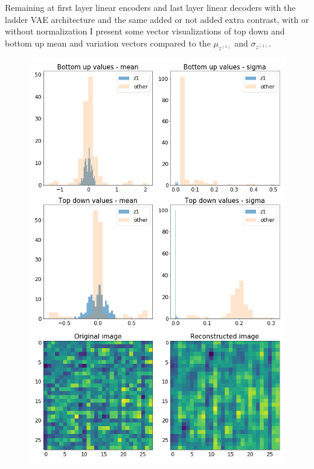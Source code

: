 \documentclass[12pt, english]{article}
\begin{document}
\vspace{4mm}

\par Remaining at first layer linear encoders and last layer linear decoders with the ladder VAE architecture and the same added or not added extra contrast, with or without normalization I present some vector visualizations of top down and bottom up mean and variation vectors compared to the $\mu_{z^{(1)}}$ and $\sigma_{z^{(1)}}$.

\vspace{4mm}

\begin{figure}[H]
  \begin{minipage}{0.5\linewidth}
    \centering
    \includegraphics[width=.6\linewidth]{z1_vis/14_DenseLinLinLadderVAE_noContrastNorm_-stats-1_TD_BU_COMPS_1.png}
  \end{minipage}
  \begin{minipage}{0.5\linewidth}
    \centering

\end{minipage}
\end{figure}
\end{document}
